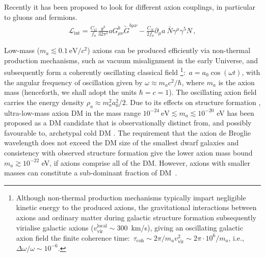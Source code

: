 Recently it has been proposed to look for different axion couplings, in particular to gluons and fermions.
\begin{align}
  \label{Axion_couplings}
  \mathcal{L}_{\textrm{int}} = \frac{C_G}{f_a} \frac{g^2}{32\pi^2} a G^{b}_{\mu \nu} \tilde{G}^{b \mu \nu}  - \frac{C_N}{2f_a} \partial_\mu a ~ \bar{N} \gamma^\mu \gamma^5 N \, ,
\end{align}



Low-mass ($m_a \lesssim 0.1~\textrm{eV}/c^2$) axions can be produced efficiently via non-thermal production mechanisms, such as vacuum misalignment \cite{Preskill1983cosmo,Sikivie1983cosmo,Dine1983cosmo} in the early Universe, and subsequently form a coherently oscillating classical field \footnote{Although non-thermal production mechanisms typically impart negligible kinetic energy to the produced axions, the gravitational interactions between axions and ordinary matter during galactic structure formation subsequently virialise galactic axions ($v_{\textrm{vir}}^{\textrm{local}} \sim 300$~km/s), giving an oscillating galactic axion field the finite coherence time:~$\tau_{\textrm{coh}} \sim 2\pi / m_a v_{\textrm{vir}}^2 \sim 2\pi \cdot 10^6 / m_a $, i.e., $\Delta \omega / \omega \sim 10^{-6}$. }:~$a = a_0 \cos(\omega t)$, with the angular frequency of oscillation given by $\omega \approx m_a c^2 / \hbar$, where $m_a$ is the axion mass (henceforth, we shall adopt the units $\hbar = c = 1$).
The oscillating axion field carries the energy density $\rho_a \approx m_a^2 a_0^2 /2$. Due to its effects on structure formation \cite{Khlopov1985}, ultra-low-mass axion DM in the mass range $10^{-24}~\textrm{eV} \lesssim m_a \lesssim 10^{-20}$ eV has been proposed as a DM candidate that is observationally distinct from, and possibly favourable to, archetypal cold DM \cite{Hu2000,Marsh2014,Schive2014,Marsh2015Review,Hui2017}.
The requirement that the axion de Broglie wavelength does not exceed the DM size of the smallest dwarf galaxies and consistency with observed structure formation \cite{Marsh2015B,Schive2015,Marsh2017} give the lower axion mass bound $m_a \gtrsim 10^{-22}$ eV, if axions comprise all of the DM. However, axions with smaller masses can constitute a sub-dominant fraction of DM~\cite{Hlozek15}.

